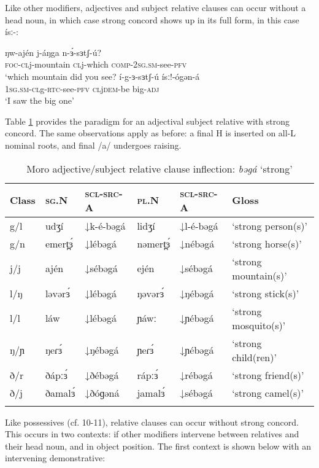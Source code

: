 Like other modifiers, adjectives and subject relative clauses can occur without a head noun, in which case strong concord shows up in its full form, in this case ísː-:

\ea 
	\ea \gll	ŋw-ajén 	j-áŋga 	n-ɜ́-sɜtʃ-ú?\\
\textsc{foc}-\textsc{cl}j-mountain	\textsc{cl}j-which	\textsc{comp}-2\textsc{sg}.\textsc{sm}-see-\textsc{pfv}\\
		\glt		‘which mountain did you see?
	\ex	\gll 	í-g-ɜ-sɜtʃ-ú 	ísː!-ógən-á\\
	1\textsc{sg}.\textsc{sm}-\textsc{cl}g-\textsc{rtc}-see-\textsc{pfv}	\textsc{cl}j\textsc{dem}-be big-\textsc{adj}	\\
		\glt		‘I saw the big one’
	\z
\z

Table \ref{tab:ch8:4} provides the paradigm for an adjectival subject relative with strong concord. The same observations apply as before: a final H is inserted on all-L nominal roots, and final /a/ undergoes raising.%

\begin{table}
 \begin{tabular}[t]{llllll}
 \lsptoprule
Class &	\textsc{sg}.N& \textsc{scl}-\textsc{src}-A	& 	\textsc{pl}.N 	& 	\textsc{scl}-\textsc{src}-A	& Gloss\\
 \midrule
 g/l	& udʒí 	& ↓k-é-bəgá	& 	lidʒí	& ↓l-é-bəgá	& ‘strong person(s)’\\
g/n	& emert̪ɜ́& 	↓lébəgá	& 	nəmert̪ɜ́	& ↓nébəgá	& ‘strong horse(s)’\\
j/j	& ajén	& ↓sébəgá	& 	ején	& ↓sébəgá	& ‘strong mountain(s)’\\
l/ŋ	& ləvərɜ́& 	↓lébəgá	& 	ŋəvərɜ́	& ↓ŋébəgá& 	‘strong stick(s)’\\
l/l	& láw	& 	↓lébəgá	& 	ɲáwː	& ↓ɲébəgá	& ‘strong mosquito(s)’\\
ŋ/ɲ	& ŋeɾɜ́	& ↓ŋébəgá	& 	ɲeɾɜ́	& ↓ɲébəgá	& ‘strong child(ren)’\\
ð/r	& ðápːɜ́	& ↓ðébəgá	& 	rápːɜ́	& ↓rébəgá	& ‘strong friend(s)’\\
ð/j	& ðamalɜ́& 	↓ðóɡəná	& 	jamalɜ́	& ↓sébəgá	& ‘strong camel(s)’\\
 \lspbottomrule
 \end{tabular}
  \caption{Moro adjective/subject relative clause inflection: \textit{bəgá} ‘strong’}
  \label{tab:ch8:4}
\end{table}

Like possessives (cf. 10-11), relative clauses can occur without strong concord. This occurs in two contexts: if other modifiers intervene between relatives and their head noun, and in object position. The first context is shown below with an intervening demonstrative:

